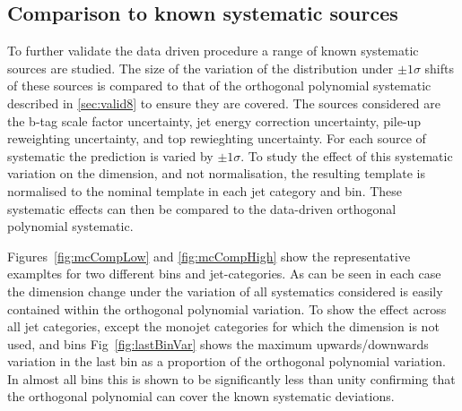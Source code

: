 \subsection{Comparison to known systematic sources}
\label{sec:mcSystStudiesShape}
To further validate the data driven procedure a range of known systematic sources are studied.
The size of the variation of the \mht distribution under $\pm1\sigma$ shifts of these sources is compared 
to that of the orthogonal polynomial systematic described in \ref{sec:valid8} to ensure they are
covered. The sources considered are the b-tag scale factor uncertainty, jet energy correction uncertainty, 
pile-up reweighting uncertainty, and top \Pt rewieghting uncertainty. For each source of systematic the prediction
is varied by $\pm1\sigma$. To study the effect of this systematic variation on the \mht dimension, and not normalisation, 
the resulting template is normalised to the nominal template in each jet category and \scalht bin. 
These systematic effects can then be compared to the data-driven orthogonal polynomial systematic. 

Figures~\ref{fig:mcCompLow} and \ref{fig:mcCompHigh} show the representative exampltes for two different \scalht 
bins and jet-categories. As can be seen in each case the \mht dimension change under the variation of all 
systematics considered is easily contained within the orthogonal polynomial variation. 
To show the effect across all jet categories, except the monojet categories for which the \mht dimension is not used,
and \scalht bins Fig~\ref{fig:lastBinVar} shows the maximum upwards/downwards variation in the last 
\mht bin as a proportion of the orthogonal polynomial variation. In almost all bins this is shown to be 
significantly less than unity confirming that the orthogonal polynomial can cover the known systematic
deviations.

